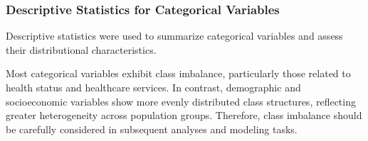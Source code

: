 \subsubsection{Descriptive Statistics for Categorical Variables}

Descriptive statistics were used to summarize categorical variables and assess their distributional characteristics.

\begin{table}[H]
\centering
\caption{Descriptive statistics for categorical variables}
\label{tab:desc_categorical}

\footnotesize
\setlength{\tabcolsep}{5pt}
\renewcommand{\arraystretch}{1.1}

\end{table}

Most categorical variables exhibit class imbalance, particularly those related to health status and healthcare services. In contrast, demographic and socioeconomic variables show more evenly distributed class structures, reflecting greater heterogeneity across population groups. Therefore, class imbalance should be carefully considered in subsequent analyses and modeling tasks.

